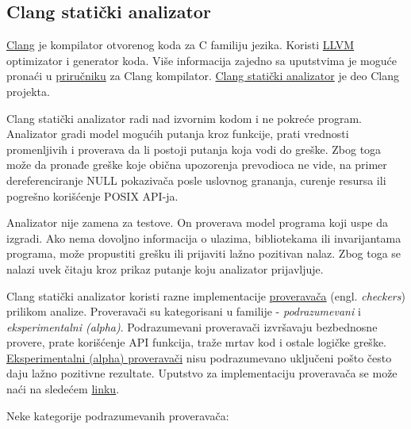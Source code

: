 \subsection{Clang statički analizator}\label{clang-staticki-analizator}

\href{https://clang.llvm.org/}{Clang} je kompilator otvorenog koda za C familiju jezika. Koristi \href{https://llvm.org/}{LLVM} optimizator i generator koda. Više informacija zajedno sa uputstvima je moguće pronaći u \href{https://clang.llvm.org/docs/UsersManual.html}{priručniku} za Clang kompilator. \href{https://clang-analyzer.llvm.org/}{Clang statički analizator} je deo Clang projekta.

Clang statički analizator radi nad izvornim kodom i ne pokreće program. Analizator gradi model mogućih putanja kroz funkcije, prati vrednosti promenljivih i proverava da li postoji putanja koja vodi do greške. Zbog toga može da pronađe greške koje obična upozorenja prevodioca ne vide, na primer dereferenciranje NULL pokazivača posle uslovnog grananja, curenje resursa ili pogrešno korišćenje POSIX API-ja.

Analizator nije zamena za testove. On proverava model programa koji uspe da izgradi. Ako nema dovoljno informacija o ulazima, bibliotekama ili invarijantama programa, može propustiti grešku ili prijaviti lažno pozitivan nalaz. Zbog toga se nalazi uvek čitaju kroz prikaz putanje koju analizator prijavljuje.

Clang statički analizator koristi razne implementacije \href{https://clang-analyzer.llvm.org/available_checks.html}{proveravača} (engl. \emph{checkers}) prilikom analize. Proveravači su kategorisani u familije - \emph{podrazumevani} i \emph{eksperimentalni (alpha)}. Podrazumevani proveravači izvršavaju bezbednosne provere, prate korišćenje API funkcija, traže mrtav kod i ostale logičke greške. \href{https://clang-analyzer.llvm.org/alpha_checks.html}{Eksperimentalni (alpha) proveravači} nisu podrazumevano uključeni pošto često daju lažno pozitivne rezultate. Uputstvo za implementaciju proveravača se može naći na sledećem \href{https://clang-analyzer.llvm.org/checker_dev_manual.html}{linku}.

Neke kategorije podrazumevanih proveravača:

